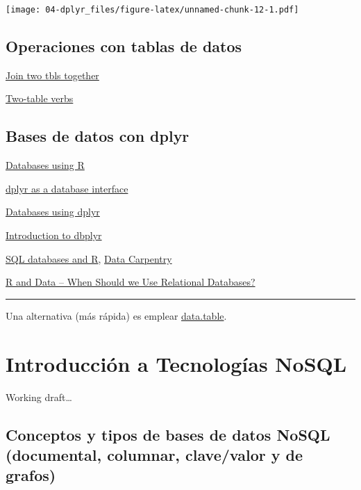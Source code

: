 \documentclass[]{book}
\begin{document}
\texttt{[image: 04-dplyr\_files/figure-latex/unnamed-chunk-12-1.pdf]}

\hypertarget{operaciones-con-tablas-de-datos-1}{%
\section{Operaciones con tablas de datos}\label{operaciones-con-tablas-de-datos-1}}

\href{https://dplyr.tidyverse.org/reference/join.html}{Join two tbls together}

\href{https://dplyr.tidyverse.org/articles/two-table.html}{Two-table verbs}

\hypertarget{bases-de-datos-con-dplyr}{%
\section{Bases de datos con dplyr}\label{bases-de-datos-con-dplyr}}

\href{https://db.rstudio.com}{Databases using R}

\href{https://db.rstudio.com/overview}{dplyr as a database interface}

\href{https://db.rstudio.com/dplyr}{Databases using dplyr}

\href{https://dbplyr.tidyverse.org/articles/dbplyr.html}{Introduction to dbplyr}

\href{https://datacarpentry.org/R-ecology-lesson/05-r-and-databases.html}{SQL databases and R}, \href{https://datacarpentry.org/R-ecology-lesson/index.html}{Data Carpentry}

\href{https://intellixus.com/2018/06/29/r-and-data-when-should-we-use-relational-databases}{R and Data -- When Should we Use Relational Databases?}

\begin{center}\rule{0.5\linewidth}{\linethickness}\end{center}

Una alternativa (más rápida) es emplear
\href{https://rdatatable.gitlab.io/data.table}{data.table}.

\hypertarget{introduccion-a-tecnologias-nosql}{%
\chapter{Introducción a Tecnologías NoSQL}\label{introduccion-a-tecnologias-nosql}}

Working draft\ldots{}

\hypertarget{conceptos-y-tipos-de-bases-de-datos-nosql-documental-columnar-clavevalor-y-de-grafos}{%
\section{Conceptos y tipos de bases de datos NoSQL (documental, columnar, clave/valor y de grafos)}\label{conceptos-y-tipos-de-bases-de-datos-nosql-documental-columnar-clavevalor-y-de-grafos}}
\end{document}
